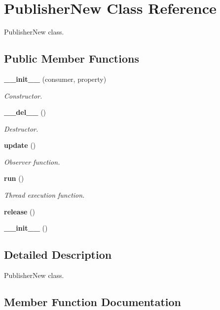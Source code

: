 \section{Publisher\-New Class Reference}
\label{classPublisherNew}
Publisher\-New class.  


\subsection*{Public Member Functions}
\begin{CompactItemize}
\item 
{\bf \_\-\_\-init\_\-\_\-} (consumer, property)
\begin{CompactList}\small\item\em Constructor. \item\end{CompactList}\item 
{\bf \_\-\_\-del\_\-\_\-} ()
\begin{CompactList}\small\item\em Destructor. \item\end{CompactList}\item 
{\bf update} ()
\begin{CompactList}\small\item\em Observer function. \item\end{CompactList}\item 
{\bf run} ()
\begin{CompactList}\small\item\em Thread execution function. \item\end{CompactList}\item 
{\bf release} ()
\item 
{\bf \_\-\_\-init\_\-\_\-} ()
\end{CompactItemize}


\subsection{Detailed Description}
Publisher\-New class. 



\subsection{Member Function Documentation}

